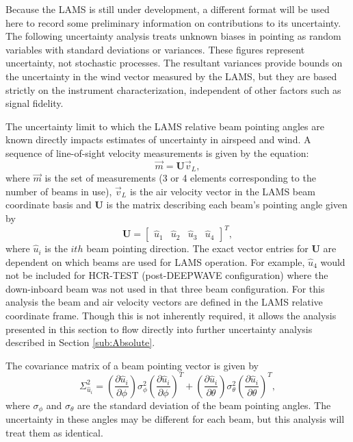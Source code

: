 \documentclass[12pt,twoside,english]{article}\usepackage[]{graphicx}\usepackage[]{color}
\begin{document}
{{Because the LAMS is still under development, a different format will be used here to record some preliminary information on contributions to its uncertainty.  
The following uncertainty analysis treats unknown biases in pointing as random variables with standard deviations or variances. These figures represent uncertainty, not stochastic processes. The resultant variances provide bounds on the uncertainty in the wind vector measured by the LAMS, but they are based strictly on the instrument characterization, independent of other factors such as signal fidelity. 

The uncertainty limit to which the LAMS relative beam pointing angles are known directly impacts estimates of uncertainty in airspeed and wind. A sequence of line-of-sight velocity measurements is given by the equation:  
\begin{equation}
\vec{m}=\mathbf{U}\vec{v}_{L},\label{Vmeas}
\end{equation}
where $\vec{m}$ is the set of measurements (3 or 4 elements corresponding to the number of beams in use), $\vec{v}_{L}$ is the air velocity vector in the LAMS beam coordinate basis and $\mathbf{U}$ is the matrix describing each beam's pointing angle given by  
\begin{equation}
\mathbf{U}=\left[\begin{array}{cccc} \hat{u}_{1} & \hat{u}_{2} & \hat{u}_{3} & \hat{u}_{4}\end{array}\right]^{T},\label{Umatrix}
\end{equation}
where $\hat{u}_{i}$ is the $ith$ beam pointing direction. The exact vector entries for $\mathbf{U}$ are dependent on which beams are used for LAMS operation. For example, $\hat{u}_{4}$ would not be included for HCR-TEST (post-DEEPWAVE configuration) where the down-inboard beam was not used in that three beam configuration. For this analysis the beam and air velocity vectors are defined in the LAMS relative coordinate frame. Though this is not inherently required, it allows the analysis presented in this section to flow directly into further uncertainty analysis described in Section \ref{sub:Absolute}. 

The covariance matrix of a beam pointing vector is given by  
\begin{equation}
\Sigma_{\hat{u}_{i}}^{2}=\left(\frac{\partial\hat{u}_{i}}{\partial\phi}\right)\sigma_{\phi}^{2}\left(\frac{\partial\hat{u}_{i}}{\partial\phi}\right)^{T}+\left(\frac{\partial\hat{u}_{i}}{\partial\theta}\right)\sigma_{\theta}^{2}\left(\frac{\partial\hat{u}_{i}}{\partial\theta}\right)^{T},\label{CovUvec} 
\end{equation}
where $\sigma_{\phi}$ and $\sigma_{\theta}$ are the standard deviation of the beam pointing angles. The uncertainty in these angles may be different for each beam, but this analysis will treat them as identical. 

}}
\end{document}
